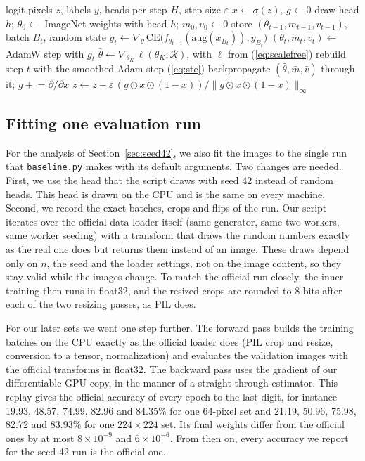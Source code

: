 \documentclass[journal]{IEEEtran}
\begin{document}
\begin{algorithm}[t]
\caption{One outer step of PFD}
\label{alg:pfd}
\begin{algorithmic}[1]
\Require logit pixels $z$, labels $y$, heads per step $H$, step size $\varepsilon$
\State $x \gets \sigma(z)$, $g \gets 0$
  \State draw head $h$; $\theta_0 \gets$ ImageNet weights with head $h$; $m_0, v_0 \gets 0$
   
    \State store $(\theta_{t-1}, m_{t-1}, v_{t-1})$, batch $B_t$, random state
    \State $g_t \gets \nabla_\theta\,\mathrm{CE}\big(f_{\theta_{t-1}}(\mathrm{aug}(x_{B_t})), y_{B_t}\big)$
    \State $(\theta_t, m_t, v_t) \gets$ AdamW step with $g_t$
  \EndFor
  \State $\bar\theta \gets \nabla_{\theta_K}\,\ell(\theta_K;\mathcal{R})$, with $\ell$ from (\ref{eq:scalefree})
   
    \State rebuild step $t$ with the smoothed Adam step (\ref{eq:ste})
    \State backpropagate $(\bar\theta, \bar m, \bar v)$ through it; $g \mathrel{+}= \partial/\partial x$
  \EndFor
\EndFor
\State $z \gets z - \varepsilon\, (g \odot x \odot (1-x)) / \|g \odot x \odot (1-x)\|_\infty$
\end{algorithmic}
\end{algorithm}

\subsection{Fitting one evaluation run}
\label{sec:method42}
For the analysis of Section~\ref{sec:seed42}, we also fit the images to the single run that \texttt{baseline.py}
makes with its default arguments. Two changes are needed. First, we use the head that the script draws with seed
42 instead of random heads. This head is drawn on the CPU and is the same on every machine. Second, we record the
exact batches, crops and flips of the run. Our script iterates over the official data loader itself (same generator,
same two workers, same worker seeding) with a transform that draws the random numbers exactly as the real one does
but returns them instead of an image. These draws depend only on $n$, the seed and the loader settings, not on the
image content, so they stay valid while the images change. To match the official run closely, the inner training
then runs in float32, and the resized crops are rounded to 8 bits after each of the two resizing passes, as PIL does.

For our later sets we went one step further. The forward pass builds the training batches on the CPU exactly as the
official loader does (PIL crop and resize, conversion to a tensor, normalization) and evaluates the validation images
with the official transforms in float32. The backward pass uses the gradient of our differentiable GPU copy, in the
manner of a straight-through estimator. This replay gives the official accuracy of every epoch to the last digit,
for instance 19.93, 48.57, 74.99, 82.96 and 84.35\% for one 64-pixel set and 21.19, 50.96, 75.98, 82.72 and 83.93\%
for one $224\times224$ set. Its final weights differ from the official ones by at most $8\times10^{-9}$ and
$6\times10^{-6}$. From then on, every accuracy we report for the seed-42 run is the official one.
\end{document}
